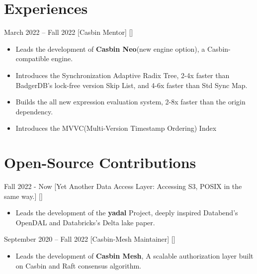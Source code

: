 \documentclass{wenycv}
\begin{document}
\begin{basicinfo}
\end{basicinfo}

\section{Experiences}

  {March 2022 -- Fall 2022}
  [Casbin Mentor]
  [] %
  \begin{itemize}
    \item Leads the development of \textbf{Casbin Neo}(new engine option), a Casbin-compatible engine. 
    \item Introduces the Synchronization Adaptive Radix Tree, 2-4x faster than BadgerDB's lock-free version Skip List, and 4-6x faster than Std Sync Map.  
    \item Builds the all new expression evaluation system, 2-8x faster than the origin dependency.  
    \item Introduces the MVVC(Multi-Version Timestamp Ordering) Index  

  \end{itemize}


\section{Open-Source Contributions}

  {Fall 2022 - Now}
  [Yet Another Data Access Layer: Accessing S3, POSIX in the same way.]
  []
  \begin{itemize}
    \item Leads the development of the \textbf{yadal} Project, deeply inspired Databend's OpenDAL and Databricks's Delta lake paper.
  \end{itemize}

  {September 2020 -- Fall 2022}
  [Casbin-Mesh Maintainer]
  []
  \begin{itemize}
    \item Leads the development of \textbf{Casbin Mesh}, A scalable authorization layer built on Casbin and Raft consensus algorithm.
  \end{itemize}
 
\end{document}
